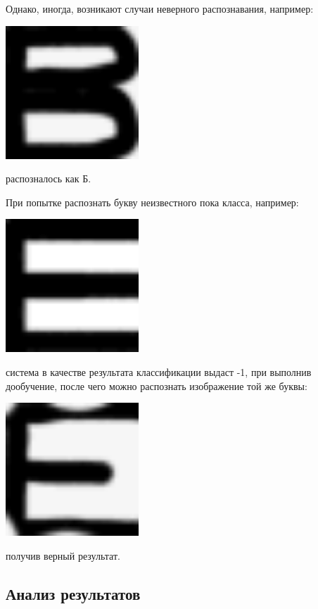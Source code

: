 Однако, иногда, возникают случаи неверного распознавания, например:
\begin{center}
	\includegraphics[width=5cm]{image_for_report/sample_v.bmp}
\end{center}
распозналось как Б.


При попытке распознать букву неизвестного пока класса, например:
\begin{center}
	\includegraphics[width=5cm]{image_for_report/sample_e.bmp}
\end{center}
система в качестве результата классификации выдаст -1, при выполнив дообучение, после чего можно распознать изображение той же буквы:
\begin{center}
	\includegraphics[width=5cm]{image_for_report/sample_e_2.bmp}
\end{center}
получив верный результат.




\subsection{Анализ результатов}

